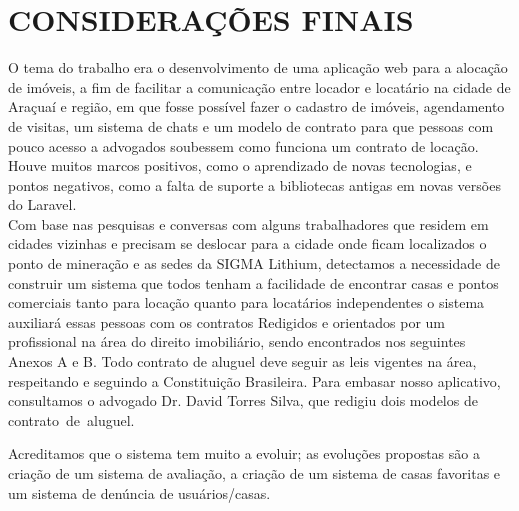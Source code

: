 \chapter{CONSIDERAÇÕES FINAIS}

O tema do trabalho era o desenvolvimento de uma aplicação web para a alocação de imóveis, a fim de facilitar a comunicação entre locador e locatário na cidade de Araçuaí e região, em que fosse possível fazer o cadastro de imóveis, agendamento de visitas, um sistema de chats e um modelo de contrato para que pessoas com pouco acesso a advogados soubessem como funciona um contrato de locação. Houve muitos marcos positivos, como o aprendizado de novas tecnologias, e pontos negativos, como a falta de suporte a bibliotecas antigas em novas versões do Laravel.\\

Com base nas pesquisas e conversas com alguns trabalhadores que residem em cidades vizinhas e precisam se deslocar para a cidade onde ficam localizados o ponto de mineração e as sedes da SIGMA Lithium, detectamos a necessidade de construir um sistema que todos tenham a facilidade de encontrar casas e pontos comerciais tanto para locação quanto para locatários independentes o sistema auxiliará essas pessoas com os contratos Redigidos e orientados por um profissional na área do direito imobiliário, sendo encontrados nos seguintes Anexos A e B. Todo contrato de aluguel deve seguir as leis vigentes na área, respeitando e seguindo a Constituição Brasileira. Para embasar nosso aplicativo, consultamos o advogado Dr. David Torres Silva, que redigiu dois modelos de contrato de aluguel.

Acreditamos que o sistema tem muito a evoluir; as evoluções propostas são a criação de um sistema de avaliação, a criação de um sistema de casas favoritas e um sistema de denúncia de usuários/casas.

